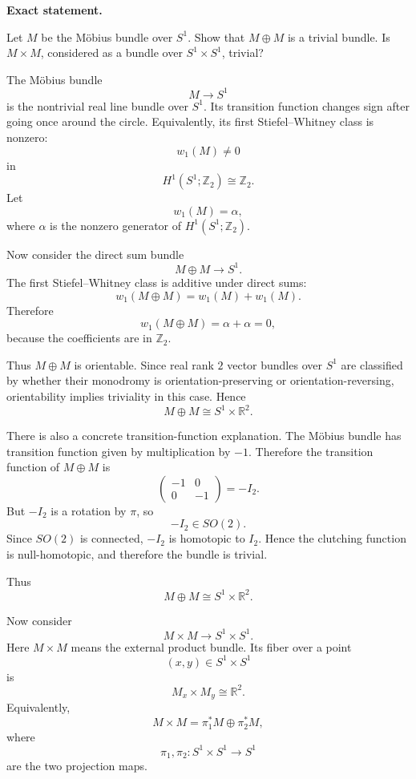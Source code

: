 \begin{problem}

\medskip
\noindent\textbf{Exact statement.}\par
\smallskip

	Let \(M\) be the M\"obius bundle over \(S^{1}\). Show that \(M\oplus M\) is a trivial bundle. Is \(M\times M\), considered as a bundle over \(S^{1}\times S^{1}\), trivial?
\end{problem}

\begin{solution}
The M\"obius bundle
	\[
	M\to S^{1}
	\]
	is the nontrivial real line bundle over \(S^{1}\). Its transition function changes sign after going once around the circle. Equivalently, its first Stiefel--Whitney class is nonzero:
	\[
	w_{1}(M)\neq 0
	\]
	in
	\[
	H^{1}(S^{1};\mathbb Z_{2})\cong \mathbb Z_{2}.
	\]
	Let
	\[
	w_{1}(M)=\alpha,
	\]
	where \(\alpha\) is the nonzero generator of \(H^{1}(S^{1};\mathbb Z_{2})\).

	Now consider the direct sum bundle
	\[
	M\oplus M\to S^{1}.
	\]
	The first Stiefel--Whitney class is additive under direct sums:
	\[
	w_{1}(M\oplus M)
	=
	w_{1}(M)+w_{1}(M).
	\]
	Therefore
	\[
	w_{1}(M\oplus M)
	=
	\alpha+\alpha
	=
	0,
	\]
	because the coefficients are in \(\mathbb Z_{2}\).

	Thus \(M\oplus M\) is orientable. Since real rank \(2\) vector bundles over \(S^{1}\) are classified by whether their monodromy is orientation-preserving or orientation-reversing, orientability implies triviality in this case. Hence
	\[
	M\oplus M\cong S^{1}\times \mathbb R^{2}.
	\]

	There is also a concrete transition-function explanation. The M\"obius bundle has transition function given by multiplication by \(-1\). Therefore the transition function of \(M\oplus M\) is
	\[
	\begin{pmatrix}
		-1&0\\
		0&-1
	\end{pmatrix}
	=
	-I_{2}.
	\]
	But \(-I_{2}\) is a rotation by \(\pi\), so
	\[
	-I_{2}\in SO(2).
	\]
	Since \(SO(2)\) is connected, \(-I_{2}\) is homotopic to \(I_{2}\). Hence the clutching function is null-homotopic, and therefore the bundle is trivial.

	Thus
	\[
	\boxed{M\oplus M\cong S^{1}\times \mathbb R^{2}.}
	\]

	Now consider
	\[
	M\times M\to S^{1}\times S^{1}.
	\]
	Here \(M\times M\) means the external product bundle. Its fiber over a point
	\[
	(x,y)\in S^{1}\times S^{1}
	\]
	is
	\[
	M_{x}\times M_{y}\cong \mathbb R^{2}.
	\]
	Equivalently,
	\[
	M\times M
	=
	\pi_{1}^{*}M\oplus \pi_{2}^{*}M,
	\]
	where
	\[
	\pi_{1},\pi_{2}:S^{1}\times S^{1}\to S^{1}
	\]
	are the two projection maps.


\end{solution}
